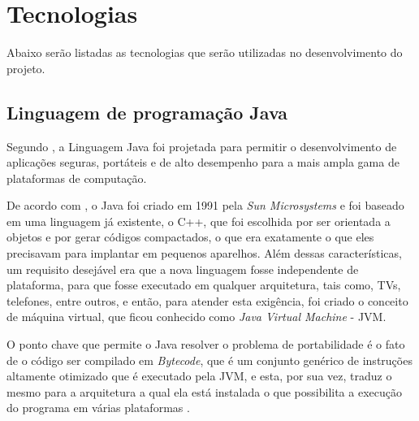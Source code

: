 \section{Tecnologias}

\par Abaixo serão listadas as tecnologias que serão utilizadas no
desenvolvimento do projeto.

\subsection{Linguagem de programação Java}

\par Segundo , a Linguagem Java foi projetada
para permitir o desenvolvimento de aplicações seguras, portáteis
e de alto desempenho para a mais ampla gama de plataformas de computação.

\par De acordo com , o Java foi
criado em 1991 pela \textit{Sun Microsystems} e foi baseado em uma linguagem já
existente, o C++, que foi escolhida por ser orientada a objetos e
por gerar códigos compactados, o que era exatamente o que eles precisavam para
implantar em pequenos aparelhos. Além dessas características, um requisito
desejável era que a nova linguagem fosse independente de plataforma, para que
fosse executado em qualquer arquitetura, tais como, TVs, telefones, entre
outros, e então, para atender esta exigência, foi
criado o conceito de máquina virtual, que ficou conhecido como \textit{Java
Virtual Machine} - JVM\footnotemark[2].


\par O ponto chave que
permite o Java resolver o problema de portabilidade é o fato de o código ser
compilado em \textit{Bytecode}, que é um conjunto genérico de instruções
altamente otimizado que é executado pela JVM, e esta, por sua vez, traduz o
mesmo para a arquitetura a qual ela está instalada o que possibilita a execução do programa
em várias plataformas \cite{livro_java_complete_references}.


% 
% 
% 


